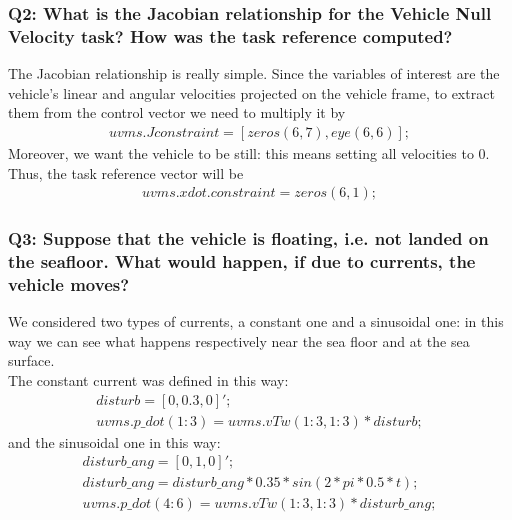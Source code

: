 \documentclass{article}
\begin{document}
\subsubsection{Q2: What is the Jacobian relationship for the Vehicle Null Velocity task? How was the task reference computed?}
The Jacobian relationship is really simple. Since the variables of interest are the vehicle's linear and angular velocities projected on the vehicle frame, to extract them from the control vector we need to multiply it by
\begin{gather*}
	uvms.Jconstraint = [zeros(6,7), eye(6,6)];
\end{gather*}
Moreover, we want the vehicle to be still: this means setting all velocities to 0. Thus, the task reference vector will be
\begin{gather*}
	uvms.xdot.constraint = zeros(6,1);
\end{gather*}

\subsubsection{Q3: Suppose that the vehicle is floating, i.e. not landed on the seafloor. What would happen, if due to currents, the vehicle moves?}
We considered two types of currents, a constant one and a sinusoidal one: in this way we can see what happens respectively near the sea floor and at the sea surface.\\
The constant current was defined in this way:
\begin{gather*}
	disturb = [0, 0.3, 0]'; \\
	uvms.p\_dot(1:3) = uvms.vTw(1:3, 1:3)*disturb;
\end{gather*}
and the sinusoidal one in this way:
\begin{gather*}
	disturb\_ang = [0, 1, 0]'; \\
	disturb\_ang = disturb\_ang*0.35*sin(2*pi*0.5*t); \\
	uvms.p\_dot(4:6) = uvms.vTw(1:3,1:3)*disturb\_ang;
\end{gather*}
\end{document}
